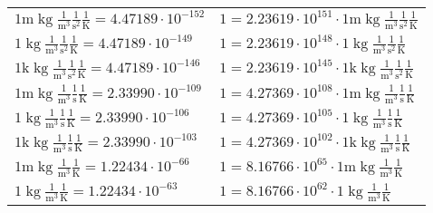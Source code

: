 \begin{center}
\begin{longtable}{l l}
\hline{\color{gray}$1 \bm{\mathrm{ m}}\operatorname{kg}\frac1{\operatorname{m}^3}\frac1{\operatorname{s}^2}{}\frac1{\operatorname{K}} = 4.47189\cdot10^{-152} $}   & {\color{gray}$ 1 = 2.23619\cdot10^{151} \cdot 1 \bm{\mathrm{ m}}\operatorname{kg}\frac1{\operatorname{m}^3}\frac1{\operatorname{s}^2}{}\frac1{\operatorname{K}}$}  \\
{\color{black}$1 \bm{\mathrm{ }}\operatorname{kg}\frac1{\operatorname{m}^3}\frac1{\operatorname{s}^2}{}\frac1{\operatorname{K}} = 4.47189\cdot10^{-149} $}   & {\color{black}$ 1 = 2.23619\cdot10^{148} \cdot 1 \bm{\mathrm{ }}\operatorname{kg}\frac1{\operatorname{m}^3}\frac1{\operatorname{s}^2}{}\frac1{\operatorname{K}}$}  \\
{\color{gray}$1 \bm{\mathrm{ k}}\operatorname{kg}\frac1{\operatorname{m}^3}\frac1{\operatorname{s}^2}{}\frac1{\operatorname{K}} = 4.47189\cdot10^{-146} $}   & {\color{gray}$ 1 = 2.23619\cdot10^{145} \cdot 1 \bm{\mathrm{ k}}\operatorname{kg}\frac1{\operatorname{m}^3}\frac1{\operatorname{s}^2}{}\frac1{\operatorname{K}}$}  \\
{\color{gray}$1 \bm{\mathrm{ m}}\operatorname{kg}\frac1{\operatorname{m}^3}\frac1{\operatorname{s}}{}\frac1{\operatorname{K}} = 2.33990\cdot10^{-109} $}   & {\color{gray}$ 1 = 4.27369\cdot10^{108} \cdot 1 \bm{\mathrm{ m}}\operatorname{kg}\frac1{\operatorname{m}^3}\frac1{\operatorname{s}}{}\frac1{\operatorname{K}}$}  \\
{\color{black}$1 \bm{\mathrm{ }}\operatorname{kg}\frac1{\operatorname{m}^3}\frac1{\operatorname{s}}{}\frac1{\operatorname{K}} = 2.33990\cdot10^{-106} $}   & {\color{black}$ 1 = 4.27369\cdot10^{105} \cdot 1 \bm{\mathrm{ }}\operatorname{kg}\frac1{\operatorname{m}^3}\frac1{\operatorname{s}}{}\frac1{\operatorname{K}}$}  \\
{\color{gray}$1 \bm{\mathrm{ k}}\operatorname{kg}\frac1{\operatorname{m}^3}\frac1{\operatorname{s}}{}\frac1{\operatorname{K}} = 2.33990\cdot10^{-103} $}   & {\color{gray}$ 1 = 4.27369\cdot10^{102} \cdot 1 \bm{\mathrm{ k}}\operatorname{kg}\frac1{\operatorname{m}^3}\frac1{\operatorname{s}}{}\frac1{\operatorname{K}}$}  \\
{\color{gray}$1 \bm{\mathrm{ m}}\operatorname{kg}\frac1{\operatorname{m}^3}{}{}\frac1{\operatorname{K}} = 1.22434\cdot10^{-66} $}   & {\color{gray}$ 1 = 8.16766\cdot10^{65} \cdot 1 \bm{\mathrm{ m}}\operatorname{kg}\frac1{\operatorname{m}^3}{}{}\frac1{\operatorname{K}}$}  \\
{\color{black}$1 \bm{\mathrm{ }}\operatorname{kg}\frac1{\operatorname{m}^3}{}{}\frac1{\operatorname{K}} = 1.22434\cdot10^{-63} $}   & {\color{black}$ 1 = 8.16766\cdot10^{62} \cdot 1 \bm{\mathrm{ }}\operatorname{kg}\frac1{\operatorname{m}^3}{}{}\frac1{\operatorname{K}}$}  \\

\end{longtable}
\end{center}
